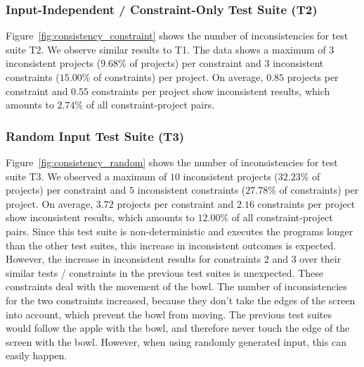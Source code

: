 \subsubsection{Input-Independent / Constraint-Only Test Suite (T2)}

Figure~\ref{fig:consistency_constraint} shows the number of inconsistencies for test suite T2.
We observe similar results to T1.
The data shows a maximum of $3$ inconsistent projects ($9.68\%$ of projects) per constraint and $3$ inconsistent constraints ($15.00\%$ of constraints) per project.
On average, $0.85$ projects per constraint and $0.55$ constraints per project show inconsistent results,
which amounts to $2.74\%$ of all constraint-project pairs.

\subsubsection{Random Input Test Suite (T3)}

Figure~\ref{fig:consistency_random} shows the number of inconsistencies for test suite T3.
We observed a maximum of $10$ inconsistent projects ($32.23\%$ of projects) per constraint and $5$ inconsistent constraints ($27.78\%$ of constraints) per project.
On average, $3.72$ projects per constraint and $2.16$ constraints per project show inconsistent results,
which amounts to $12.00\%$ of all constraint-project pairs.
Since this test suite is non-deterministic and executes the programs longer than the other test suites,
this increase in inconsistent outcomes is expected.
However, the increase in inconsistent results for constraints 2 and 3 over their similar tests / constraints in the previous test suites is unexpected.
These constraints deal with the movement of the bowl.
The number of inconsistencies for the two constraints increased, because they don't take the edges of the screen into account, which prevent the bowl from moving.
The previous test suites would follow the apple with the bowl, and therefore never touch the edge of the screen with the bowl.
However, when using randomly generated input, this can easily happen.

